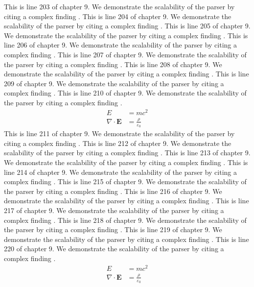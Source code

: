 This is line 203 of chapter 9. We demonstrate the scalability of the parser by citing a complex finding \cite{ref9_203}.
This is line 204 of chapter 9. We demonstrate the scalability of the parser by citing a complex finding \cite{ref9_204}.
This is line 205 of chapter 9. We demonstrate the scalability of the parser by citing a complex finding \cite{ref9_205}.
This is line 206 of chapter 9. We demonstrate the scalability of the parser by citing a complex finding \cite{ref9_206}.
This is line 207 of chapter 9. We demonstrate the scalability of the parser by citing a complex finding \cite{ref9_207}.
This is line 208 of chapter 9. We demonstrate the scalability of the parser by citing a complex finding \cite{ref9_208}.
This is line 209 of chapter 9. We demonstrate the scalability of the parser by citing a complex finding \cite{ref9_209}.
This is line 210 of chapter 9. We demonstrate the scalability of the parser by citing a complex finding \cite{ref9_210}.
\begin{align*}
  E &= mc^2 \\
  \nabla \cdot \mathbf{E} &= \frac{\rho}{\varepsilon_0}
\end{align*}
This is line 211 of chapter 9. We demonstrate the scalability of the parser by citing a complex finding \cite{ref9_211}.
This is line 212 of chapter 9. We demonstrate the scalability of the parser by citing a complex finding \cite{ref9_212}.
This is line 213 of chapter 9. We demonstrate the scalability of the parser by citing a complex finding \cite{ref9_213}.
This is line 214 of chapter 9. We demonstrate the scalability of the parser by citing a complex finding \cite{ref9_214}.
This is line 215 of chapter 9. We demonstrate the scalability of the parser by citing a complex finding \cite{ref9_215}.
This is line 216 of chapter 9. We demonstrate the scalability of the parser by citing a complex finding \cite{ref9_216}.
This is line 217 of chapter 9. We demonstrate the scalability of the parser by citing a complex finding \cite{ref9_217}.
This is line 218 of chapter 9. We demonstrate the scalability of the parser by citing a complex finding \cite{ref9_218}.
This is line 219 of chapter 9. We demonstrate the scalability of the parser by citing a complex finding \cite{ref9_219}.
This is line 220 of chapter 9. We demonstrate the scalability of the parser by citing a complex finding \cite{ref9_220}.
\begin{align*}
  E &= mc^2 \\
  \nabla \cdot \mathbf{E} &= \frac{\rho}{\varepsilon_0}
\end{align*}
